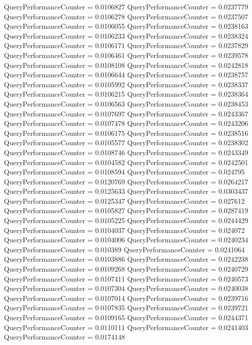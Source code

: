 \documentclass[9pt]{article}
\theoremstyle{plain}
\theoremstyle{definition}
\theoremstyle{remark}
\numberwithin{equation}{section}
\begin{document}
QueryPerformanceCounter  =  0.0106827
QueryPerformanceCounter  =  0.0237779
QueryPerformanceCounter  =  0.0106278
QueryPerformanceCounter  =  0.0237507
QueryPerformanceCounter  =  0.0106055
QueryPerformanceCounter  =  0.0238163
QueryPerformanceCounter  =  0.0106233
QueryPerformanceCounter  =  0.0238324
QueryPerformanceCounter  =  0.0106171
QueryPerformanceCounter  =  0.0237829
QueryPerformanceCounter  =  0.0106461
QueryPerformanceCounter  =  0.0239578
QueryPerformanceCounter  =  0.0108108
QueryPerformanceCounter  =  0.0242818
QueryPerformanceCounter  =  0.0106644
QueryPerformanceCounter  =  0.0238757
QueryPerformanceCounter  =  0.0105992
QueryPerformanceCounter  =  0.0238337
QueryPerformanceCounter  =  0.0106215
QueryPerformanceCounter  =  0.0238364
QueryPerformanceCounter  =  0.0106563
QueryPerformanceCounter  =  0.0238453
QueryPerformanceCounter  =  0.0107697
QueryPerformanceCounter  =  0.0243367
QueryPerformanceCounter  =  0.0107478
QueryPerformanceCounter  =  0.0243206
QueryPerformanceCounter  =  0.0106175
QueryPerformanceCounter  =  0.0238516
QueryPerformanceCounter  =  0.0105577
QueryPerformanceCounter  =  0.0238302
QueryPerformanceCounter  =  0.0108746
QueryPerformanceCounter  =  0.0243349
QueryPerformanceCounter  =  0.0104582
QueryPerformanceCounter  =  0.0242501
QueryPerformanceCounter  =  0.0108594
QueryPerformanceCounter  =  0.024795
QueryPerformanceCounter  =  0.0120769
QueryPerformanceCounter  =  0.0264217
QueryPerformanceCounter  =  0.0125633
QueryPerformanceCounter  =  0.0303437
QueryPerformanceCounter  =  0.0125347
QueryPerformanceCounter  =  0.027612
QueryPerformanceCounter  =  0.0105827
QueryPerformanceCounter  =  0.0287419
QueryPerformanceCounter  =  0.0105225
QueryPerformanceCounter  =  0.0244429
QueryPerformanceCounter  =  0.0104037
QueryPerformanceCounter  =  0.024072
QueryPerformanceCounter  =  0.0104006
QueryPerformanceCounter  =  0.0240234
QueryPerformanceCounter  =  0.010389
QueryPerformanceCounter  =  0.0241064
QueryPerformanceCounter  =  0.0103886
QueryPerformanceCounter  =  0.0242238
QueryPerformanceCounter  =  0.0109268
QueryPerformanceCounter  =  0.0240729
QueryPerformanceCounter  =  0.0107411
QueryPerformanceCounter  =  0.0240573
QueryPerformanceCounter  =  0.0107304
QueryPerformanceCounter  =  0.0240038
QueryPerformanceCounter  =  0.0107014
QueryPerformanceCounter  =  0.0239716
QueryPerformanceCounter  =  0.0107835
QueryPerformanceCounter  =  0.0239721
QueryPerformanceCounter  =  0.0109165
QueryPerformanceCounter  =  0.0244371
QueryPerformanceCounter  =  0.0110111
QueryPerformanceCounter  =  0.0241403
QueryPerformanceCounter  =  0.0174148
\end{document}
